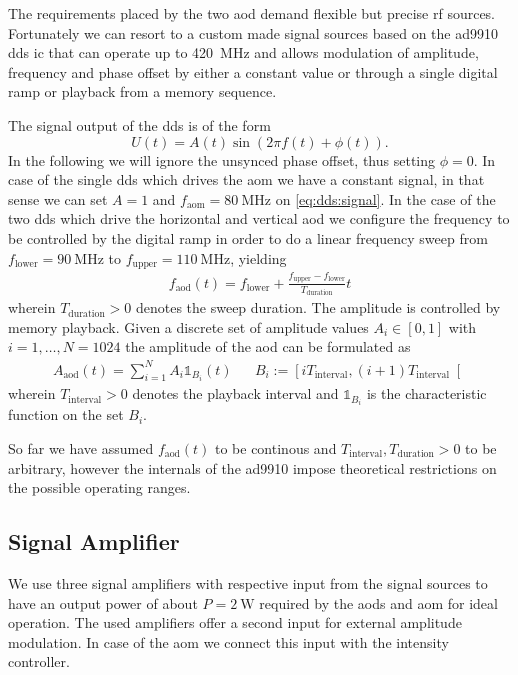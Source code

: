 The requirements placed by the two \gls{aod} demand flexible but precise
\gls{rf} sources. Fortunately we can resort to a custom made signal
sources based on the \gls{ad9910} \gls{dds} \cite{AD9910} \gls{ic} that can
operate up to \SI{420}{\mega\hertz} and allows modulation of amplitude,
frequency and phase offset by either a constant value or through a single
digital ramp or playback from a memory sequence.

The signal output of the \gls{dds} is of the form
\begin{equation}
  U(t)=A(t)\sin(2\pi f(t)+\phi(t)).
  \label{eq:dds:signal}
\end{equation}
In the following we will ignore the unsynced phase offset, thus setting
$\phi=0$. In case of the single \gls{dds} which drives the \gls{aom} we
have a constant signal, in that sense we can set $A=1$ and
$f_\text{aom}=\SI{80}{\mega\hertz}$ on \cref{eq:dds:signal}.
In the case of the two \gls{dds} which drive the horizontal and vertical
\gls{aod} we configure the frequency to be controlled by the digital ramp in
order to do a linear frequency sweep from
$f_\text{lower}=\SI{90}{\mega\hertz}$ to
$f_\text{upper}=\SI{110}{\mega\hertz}$, yielding
\begin{align}
  f_\text{aod}(t)
  =
  f_\text{lower} + \frac{f_\text{upper}-f_\text{lower}}{T_\text{duration}}t
\end{align}
wherein $T_\text{duration}>0$ denotes the sweep duration. The amplitude is
controlled by memory playback. Given a discrete set of amplitude values
$A_i\in[0,1]$ with $i=1,\dots,N=1024$ the amplitude of the \gls{aod} can be
formulated as
\begin{align}
  A_\text{aod}(t)
  =\sum^N_{i=1}A_i\mathbb{1}_{B_i}(t)
  &&
  B_i:=\left[iT_\text{interval}, (i+1)T_\text{interval}\right[
\end{align}
wherein $T_\text{interval}>0$ denotes the playback interval and
$\mathbb{1}_{B_i}$ is the characteristic function on the set $B_i$.

So far we have assumed $f_\text{aod}(t)$ to be continous and
$T_\text{interval},T_\text{duration}>0$ to be arbitrary, however the internals
of the \gls{ad9910} impose theoretical restrictions on the possible operating
ranges.

\subsection{Signal Amplifier}

We use three signal amplifiers with respective input from the signal sources
to have an output power of about $P=\SI{2}{\watt}$ required by the \gls{aod}s
and \gls{aom} for ideal operation. The used amplifiers offer a second input
for external amplitude modulation. In case of the \gls{aom} we connect this
input with the intensity controller.

